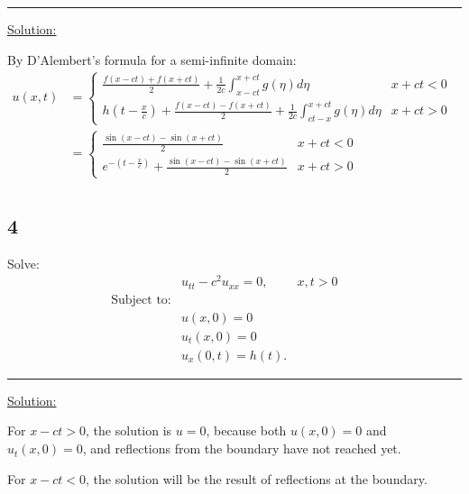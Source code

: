 \documentclass{article}
\begin{document}
\begin{center}
  \noindent\rule{8cm}{0.4pt}
\end{center}

\underline{Solution:}

By D'Alembert's formula for a semi-infinite domain:
\begin{align*}
  u(x,t) 
  &= \begin{cases}
    \frac{f(x-ct) + f(x+ct)}{2} + \frac{1}{2c} \int_{x-ct}^{x+ct} g(\eta) d\eta & x+ct < 0 \\
    h(t-\frac{x}{c}) + \frac{f(x-ct) - f(x+ct)}{2} + \frac{1}{2c} \int_{ct-x}^{x+ct} g(\eta) d\eta & x+ct > 0
  \end{cases} &&\\
  &= \begin{cases}
    \frac{\sin(x-ct) - \sin(x+ct)}{2} & x+ct < 0 \\
    e^{-(t-\frac{x}{c})} + \frac{\sin(x-ct) - \sin(x+ct)}{2} & x+ct > 0
  \end{cases} &&\\
\end{align*}


\subsection*{4}
Solve:
\begin{align*}
  &u_{tt} - c^2 u_{xx} = 0,  &x,t > 0 &&\\
  \text{Subject to:} \\
  &u(x,0) = 0 &&\\
  &u_t(x,0) = 0 &&\\
  &u_x(0,t) = h(t).
\end{align*}

\begin{center}
  \noindent\rule{8cm}{0.4pt}
\end{center}

\underline{Solution:}

For $x-ct > 0$, the solution is $u = 0$, because both $u(x,0) = 0$ and $u_t(x,0) = 0$, and reflections from the boundary have not reached yet.
\newline

For $x-ct < 0$, the solution will be the result of reflections at the boundary.
\end{document}
